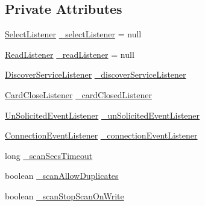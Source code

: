 \subsection*{Private Attributes}
\begin{DoxyCompactItemize}
\item 
\mbox{\hyperlink{interfacecom_1_1ethernom_1_1android_1_1etherapi_1_1_select_listener}{Select\+Listener}} \mbox{\hyperlink{classcom_1_1ethernom_1_1android_1_1etherapi_1_1_ether_a_p_i_accc3f965344597c47dfc72a8df5e8fe3}{\+\_\+select\+Listener}} = null
\item 
\mbox{\hyperlink{interfacecom_1_1ethernom_1_1android_1_1etherapi_1_1_read_listener}{Read\+Listener}} \mbox{\hyperlink{classcom_1_1ethernom_1_1android_1_1etherapi_1_1_ether_a_p_i_ac56cb305d48a76b7b286838a54fa07b5}{\+\_\+read\+Listener}} = null
\item 
\mbox{\hyperlink{interfacecom_1_1ethernom_1_1android_1_1etherapi_1_1_discover_service_listener}{Discover\+Service\+Listener}} \mbox{\hyperlink{classcom_1_1ethernom_1_1android_1_1etherapi_1_1_ether_a_p_i_a1998f4cdc36ec1700e910018cae401ad}{\+\_\+discover\+Service\+Listener}}
\item 
\mbox{\hyperlink{interfacecom_1_1ethernom_1_1android_1_1etherapi_1_1_card_close_listener}{Card\+Close\+Listener}} \mbox{\hyperlink{classcom_1_1ethernom_1_1android_1_1etherapi_1_1_ether_a_p_i_a1b0348df6d6a3e23e1bae204e18d5dc1}{\+\_\+card\+Closed\+Listener}}
\item 
\mbox{\hyperlink{interfacecom_1_1ethernom_1_1android_1_1etherapi_1_1_un_solicited_event_listener}{Un\+Solicited\+Event\+Listener}} \mbox{\hyperlink{classcom_1_1ethernom_1_1android_1_1etherapi_1_1_ether_a_p_i_a1ef177f46e8bf77977dfb017591e66db}{\+\_\+un\+Solicited\+Event\+Listener}}
\item 
\mbox{\hyperlink{interfacecom_1_1ethernom_1_1android_1_1etherapi_1_1_connection_event_listener}{Connection\+Event\+Listener}} \mbox{\hyperlink{classcom_1_1ethernom_1_1android_1_1etherapi_1_1_ether_a_p_i_ab62c134bcd6f59dbf43f1039134995cc}{\+\_\+connection\+Event\+Listener}}
\item 
long \mbox{\hyperlink{classcom_1_1ethernom_1_1android_1_1etherapi_1_1_ether_a_p_i_aebc393c58cd578de76684a2ec0c45038}{\+\_\+scan\+Secs\+Timeout}}
\item 
boolean \mbox{\hyperlink{classcom_1_1ethernom_1_1android_1_1etherapi_1_1_ether_a_p_i_ae2263ea5984b31836d41847b7d8ddca6}{\+\_\+scan\+Allow\+Duplicates}}
\item 
boolean \mbox{\hyperlink{classcom_1_1ethernom_1_1android_1_1etherapi_1_1_ether_a_p_i_ad6d683fc0000af5cf4ab181110f5a270}{\+\_\+scan\+Stop\+Scan\+On\+Write}}
\end{DoxyCompactItemize}


